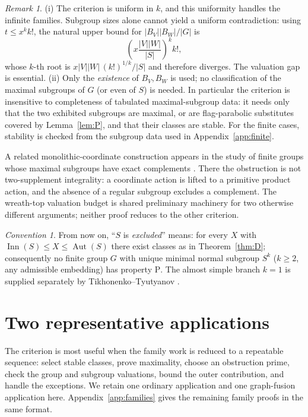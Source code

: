 \documentclass[11pt]{amsart}
\theoremstyle{definition}
\theoremstyle{remark}
\newtheorem{remark}[theorem]{Remark}
\newtheorem{convention}[theorem]{Convention}
\DeclareMathOperator{\Inn}{Inn}
\DeclareMathOperator{\Aut}{Aut}
\begin{document}
\begin{remark}\label{rem:crit}
(i) The criterion is uniform in $k$, and this uniformity handles the
infinite families. Subgroup sizes alone cannot yield a uniform contradiction:
using $t\leq x^k k!$, the natural upper bound for
$|B_V||B_W|/|G|$ is
\[
 \left(x\frac{|V||W|}{|S|}\right)^k k!,
\]
whose $k$-th root is
$x|V||W|\,(k!)^{1/k}/|S|$ and therefore diverges. The valuation gap is
essential. (ii) Only the \emph{existence} of
$B_V,B_W$ is used; no classification of the maximal subgroups of $G$
(or even of $S$) is needed. In particular the criterion is insensitive
to completeness of tabulated maximal-subgroup data: it needs only that
the two exhibited subgroups are maximal, or are flag-parabolic substitutes covered by
Lemma~\ref{lem:P}, and that their classes are stable. For the finite cases,
stability is checked from the subgroup data used in Appendix~\ref{app:finite}.
\end{remark}

A related monolithic-coordinate construction appears in the study of finite
groups whose maximal subgroups have exact complements \cite{Sater1868}.
There the obstruction is not two-supplement integrality: a coordinate action
is lifted to a primitive product action, and the absence of a regular subgroup
excludes a complement. The wreath-top valuation budget is shared preliminary
machinery for two otherwise different arguments; neither proof reduces to the
other criterion.

\begin{convention}\label{conv:excluded}
From now on, ``$S$ is \emph{excluded}'' means: for every $X$ with
$\Inn(S)\leq X\leq\Aut(S)$ there exist classes as in
Theorem~\ref{thm:D}; consequently no finite group $G$ with unique
minimal normal subgroup $S^k$ ($k\geq2$, any admissible embedding) has
property $\mathrm{P}$. The almost simple branch $k=1$ is supplied separately
by Tikhonenko--Tyutyanov \cite{TT2010}.
\end{convention}


\section{Two representative applications}\label{sec:applications}

The criterion is most useful when the family work is reduced to a repeatable
sequence: select stable classes, prove maximality, choose an obstruction prime,
check the group and subgroup valuations, bound the outer contribution, and
handle the exceptions. We retain one ordinary application and one graph-fusion
application here. Appendix~\ref{app:families} gives the remaining family
proofs in the same format.
\end{document}
